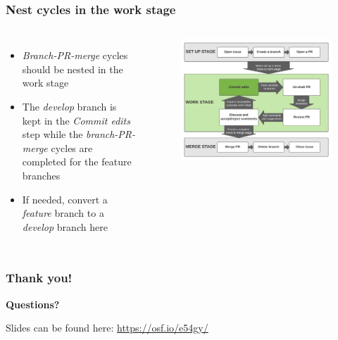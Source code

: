 \documentclass[aspectratio=169]{beamer} %
\begin{document}
\begin{frame}
	\frametitle{Nest cycles in the work stage}
	\begin{columns}[c]

		\begin{itemize}
			\setlength\itemsep{1em}
			\item \textit{Branch-PR-merge} cycles should be nested
			in the work stage
			\item The \textit{develop} branch is kept
			in the \textit{Commit edits} step while
			the \textit{branch-PR-merge} cycles are completed
			for the feature branches
			\item If needed, convert a \textit{feature} branch
			to a \textit{develop} branch here
		\end{itemize}

		\vspace{-.75cm}
		\begin{figure}
			\centering
			\includegraphics[width=\textwidth]{./img/branch-pr-merge-cycle-S2-1.png}
		\end{figure}
	\end{columns}
\end{frame}

\begin{frame}
	\frametitle{Thank you!}
	\huge\centering \textbf{Questions?}

	\vspace{1cm}
	\normalsize Slides can be found here: \url{https://osf.io/e54gy/}
\end{frame}
\end{document}
